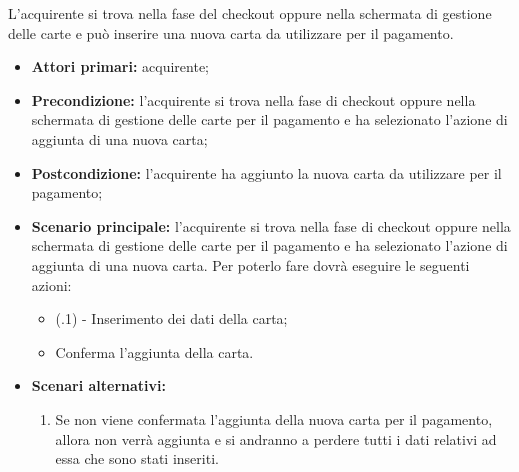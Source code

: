 
L'acquirente si trova nella fase del checkout oppure nella schermata di gestione delle carte e può inserire una nuova carta da utilizzare per il pagamento.
\begin{itemize}
    \item \textbf{Attori primari:} acquirente;
    \item \textbf{Precondizione:} l'acquirente si trova nella fase di checkout oppure nella schermata di gestione delle carte per il pagamento e ha selezionato l'azione di aggiunta di una nuova carta;
    \item \textbf{Postcondizione:} l'acquirente ha aggiunto la nuova carta da utilizzare per il pagamento;
    \item \textbf{Scenario principale:} l'acquirente si trova nella fase di checkout oppure nella schermata di gestione delle carte per il pagamento e ha selezionato l'azione di aggiunta di una nuova carta. Per poterlo fare dovrà eseguire le seguenti azioni:
    \begin{itemize}
        \item (\actualUC.1) - Inserimento dei dati della carta;
        \item Conferma l'aggiunta della carta.
    \end{itemize}
    \item \textbf{Scenari alternativi:}
    \begin{enumerate}[label=\lett]
        \item Se non viene confermata l'aggiunta della nuova carta per il pagamento, allora non verrà aggiunta e si andranno a perdere tutti i dati relativi ad essa che sono stati inseriti.
    \end{enumerate}
\end{itemize}

\resetSubUC

